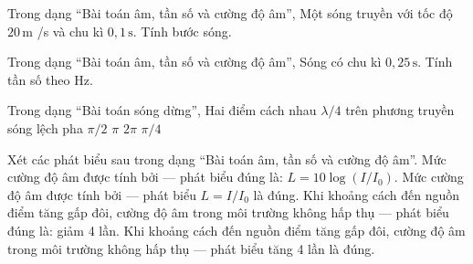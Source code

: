 \begin{bt}
Trong dạng “Bài toán âm, tần số và cường độ âm”, Một sóng truyền với tốc độ $20\,\text{m}$ /s và chu kì $0,1\,\text{s}$. Tính bước sóng.
\end{bt}

\begin{ex}
Trong dạng “Bài toán âm, tần số và cường độ âm”, Sóng có chu kì $0,25\,\text{s}$. Tính tần số theo Hz.
\end{ex}

\begin{ex}
Trong dạng “Bài toán sóng dừng”, Hai điểm cách nhau $\lambda/4$ trên phương truyền sóng lệch pha
\choice
{\True $\pi/2$}
{$\pi$}
{$2\pi$}
{$\pi/4$}
\end{ex}

\begin{ex}
Xét các phát biểu sau trong dạng “Bài toán âm, tần số và cường độ âm”.
\choiceTF
{\True Mức cường độ âm được tính bởi — phát biểu đúng là: $L=10\log(I/I_0)$.}
{Mức cường độ âm được tính bởi — phát biểu $L=I/I_0$ là đúng.}
{\True Khi khoảng cách đến nguồn điểm tăng gấp đôi, cường độ âm trong môi trường không hấp thụ — phát biểu đúng là: giảm 4 lần.}
{Khi khoảng cách đến nguồn điểm tăng gấp đôi, cường độ âm trong môi trường không hấp thụ — phát biểu tăng 4 lần là đúng.}
\end{ex}

